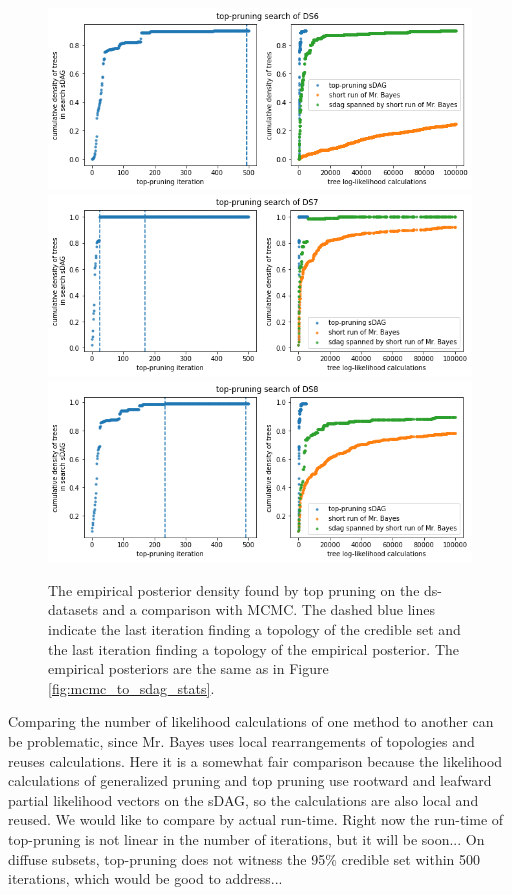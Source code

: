 \documentclass{article}
\begin{document}
\begin{figure}[!t]\centering
\includegraphics[scale=0.4]{figures/tp_ds6_pp.png}
\includegraphics[scale=0.4]{figures/tp_ds7_pp.png}
\includegraphics[scale=0.4]{figures/tp_ds8_pp.png}
\caption{The empirical posterior density found by top pruning on the ds-datasets and a comparison with MCMC.
The dashed blue lines indicate the last iteration finding a topology of the credible set and the last iteration finding a topology of the empirical posterior. 
The empirical posteriors are the same as in Figure \ref{fig:mcmc_to_sdag_stats}.}
\label{fig:topPruningFoundPosterior}
\end{figure}


Comparing the number of likelihood calculations of one method to another can be problematic, since Mr. Bayes uses local rearrangements of topologies and reuses calculations. 
Here it is a somewhat fair comparison because the likelihood calculations of generalized pruning and top pruning use 
rootward and leafward partial likelihood vectors on the sDAG, so the calculations are also local and reused.
We would like to compare by actual run-time.  
Right now the run-time of top-pruning is not linear in the number of iterations, but it will be soon...
On diffuse subsets, top-pruning does not witness the 95\% credible set within 500 iterations, which would be good to address...
\end{document}
